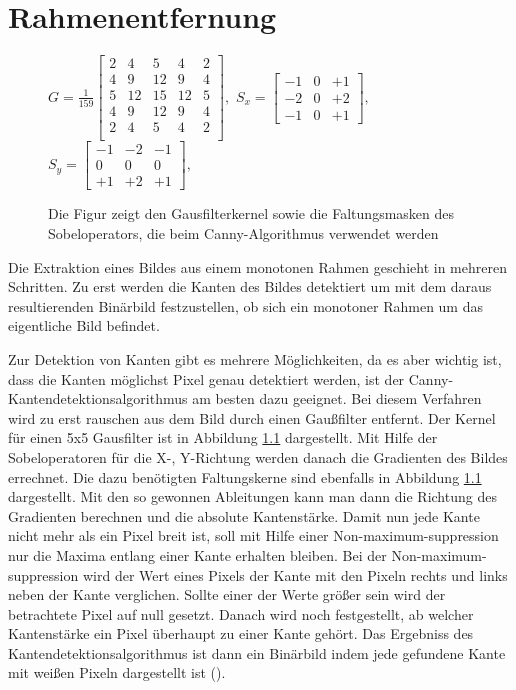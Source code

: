 \chapter{Rahmenentfernung}

\begin{figure}[h]
 	$
 	G = \frac{1}{159}
	\begin{bmatrix}
		2 & 4 & 5 & 4 & 2 \\ 
		4 & 9 & 12 & 9 & 4 \\
		5 & 12 & 15 & 12 & 5 \\
		4 & 9 & 12 & 9 & 4 \\
		2 & 4 & 5 & 4 & 2 \\
	\end{bmatrix},	
	$
	$
	S_x = 
	\begin{bmatrix}
	-1 & 0 & +1 \\
	-2 & 0 & +2 \\
	-1 & 0 & +1
	\end{bmatrix},
	$
	$	
	S_y = 
	\begin{bmatrix}
	-1 & -2 & -1 \\
	0 & 0 & 0 \\
	+1 & +2 & +1
	\end{bmatrix},
	$
\caption{Die Figur zeigt den Gausfilterkernel sowie die Faltungsmasken des Sobeloperators, die beim Canny-Algorithmus verwendet werden}
\label{fig:gauss}
\end{figure}

Die Extraktion eines Bildes aus einem monotonen Rahmen geschieht in mehreren Schritten. Zu erst werden die Kanten des Bildes detektiert um mit dem daraus resultierenden Binärbild festzustellen, ob sich ein monotoner Rahmen um das eigentliche Bild befindet. 


Zur Detektion von Kanten gibt es mehrere Möglichkeiten, da es aber wichtig ist, dass die Kanten möglichst Pixel genau detektiert werden, ist der Canny-Kantendetektionsalgorithmus am besten dazu geeignet. 
Bei diesem Verfahren wird zu erst rauschen aus dem Bild durch einen Gaußfilter entfernt. Der Kernel für einen 5x5 Gausfilter ist in Abbildung \ref{fig:gauss} dargestellt. 
Mit Hilfe der Sobeloperatoren für die X-, Y-Richtung werden danach die Gradienten des Bildes errechnet. Die dazu benötigten Faltungskerne sind ebenfalls in Abbildung \ref{fig:gauss} dargestellt. 
Mit den so gewonnen Ableitungen kann man dann die Richtung des Gradienten berechnen und die absolute Kantenstärke.
Damit nun jede Kante nicht mehr als ein Pixel breit ist, soll mit Hilfe einer Non-maximum-suppression nur die Maxima entlang einer Kante erhalten bleiben. 
Bei der Non-maximum-suppression wird der Wert eines Pixels der Kante mit den Pixeln rechts und links neben der Kante verglichen. Sollte einer der Werte größer sein wird der betrachtete Pixel auf null gesetzt.
Danach wird noch festgestellt, ab welcher Kantenstärke ein Pixel überhaupt zu einer Kante gehört. Das Ergebniss des Kantendetektionsalgorithmus ist dann ein Binärbild indem jede gefundene Kante mit weißen Pixeln dargestellt ist (\cite{OpenCVCanny}).

